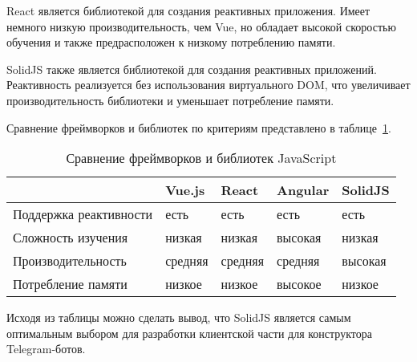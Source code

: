 React является библиотекой для создания реактивных приложения.
Имеет немного низкую производительность, чем Vue, но обладает высокой
скоростью обучения и также предрасположен к низкому потреблению памяти.

SolidJS также является библиотекой для создания реактивных
приложений. Реактивность реализуется без использования виртуального
DOM, что увеличивает производительность библиотеки и уменьшает
потребление памяти.

Сравнение фреймворков и библиотек по критериям представлено в
таблице~\ref{t:comp-client-lib}.


\begin{table}[ht]
	\Large
	\begin{threeparttable}
		\caption{Сравнение фреймворков и библиотек JavaScript}
		\label{t:comp-client-lib}
		\centering
		\begin{tabularx}{\textwidth}
			{|>{}X
			|>{\centering\arraybackslash}X
			|>{\centering\arraybackslash}X
			|>{\centering\arraybackslash}X
			|>{\centering\arraybackslash}X|}
			\hline
			        &
			Vue.js  &
			React   &
			Angular &
			SolidJS                                         \\
			\hline
			Поддержка
			реактивности
			        & есть    & есть    & есть    & есть    \\
			\hline
			Сложность изучения
			        & низкая  & низкая  & высокая & низкая  \\
			\hline
			Про\-из\-во\-ди\-тель\-ность
			        & средняя & средняя & средняя & высокая \\
			\hline
			Потребление памяти
			        & низкое  & низкое  & высокое & низкое  \\
			\hline
		\end{tabularx}
	\end{threeparttable}
	\vspace{\bottompaddingoftable}
\end{table}



Исходя из таблицы можно сделать вывод, что SolidJS является самым
оптимальным выбором для разработки клиентской части для конструктора
Telegram-ботов.
